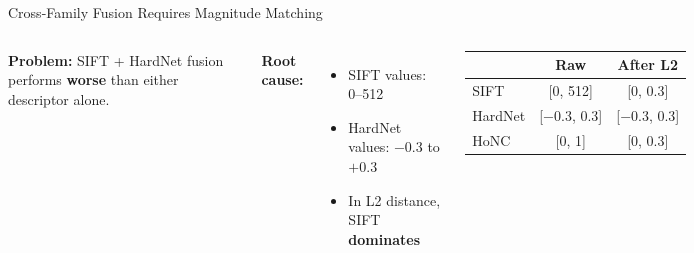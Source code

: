 \documentclass[aspectratio=169, 12pt]{beamer}
\begin{document}
\begin{frame}{Cross-Family Fusion Requires Magnitude Matching}
  \begin{columns}[T]
    \textbf{Problem:} SIFT + HardNet fusion performs \textbf{worse} than either descriptor alone.
    \vspace{0.5em}

    \textbf{Root cause:}
    \begin{itemize}\setlength{\itemsep}{2pt}
      \item SIFT values: 0--512
      \item HardNet values: $-0.3$ to $+0.3$
      \item In L2 distance, SIFT \textbf{dominates}
    \end{itemize}

    \begin{table}[h]
    \centering\small
    \begin{tabular}{lcc}
      \toprule
      & \textbf{Raw} & \textbf{After L2} \\
      \midrule
      SIFT & [0, 512] & [0, 0.3] \\
      HardNet & [$-$0.3, 0.3] & [$-$0.3, 0.3] \\
      HoNC & [0, 1] & [0, 0.3] \\
      \bottomrule
    \end{tabular}
    \end{table}
  \end{columns}
\end{frame}
\end{document}
